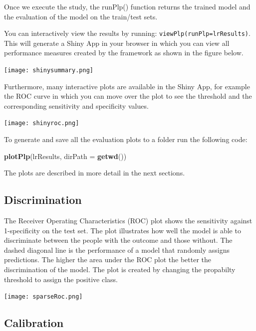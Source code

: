 \documentclass[]{article}
\newenvironment{Shaded}{\begin{snugshade}}{\end{snugshade}}
\newcommand{\KeywordTok}[1]{\textcolor[rgb]{0.13,0.29,0.53}{\textbf{#1}}}
\newcommand{\DataTypeTok}[1]{\textcolor[rgb]{0.13,0.29,0.53}{#1}}
\newcommand{\NormalTok}[1]{#1}
\begin{document}
Once we execute the study, the runPlp() function returns the trained
model and the evaluation of the model on the train/test sets.

You can interactively view the results by running:
\texttt{viewPlp(runPlp=lrResults)}. This will generate a Shiny App in
your browser in which you can view all performance measures created by
the framework as shown in the figure below.

\texttt{[image: shinysummary.png]}

Furthermore, many interactive plots are available in the Shiny App, for
example the ROC curve in which you can move over the plot to see the
threshold and the corresponding sensitivity and specificity values.

\texttt{[image: shinyroc.png]}

To generate and save all the evaluation plots to a folder run the
following code:

\begin{Shaded}
\begin{Highlighting}[]
\KeywordTok{plotPlp}\NormalTok{(lrResults, }\DataTypeTok{dirPath =} \KeywordTok{getwd}\NormalTok{())}
\end{Highlighting}
\end{Shaded}

The plots are described in more detail in the next sections.

\newpage

\subsection{Discrimination}\label{discrimination}

The Receiver Operating Characteristics (ROC) plot shows the sensitivity
against 1-specificity on the test set. The plot illustrates how well the
model is able to discriminate between the people with the outcome and
those without. The dashed diagonal line is the performance of a model
that randomly assigns predictions. The higher the area under the ROC
plot the better the discrimination of the model. The plot is created by
changing the propabilty threshold to assign the positive class.

\texttt{[image: sparseRoc.png]}

\newpage

\subsection{Calibration}\label{calibration}
\end{document}
